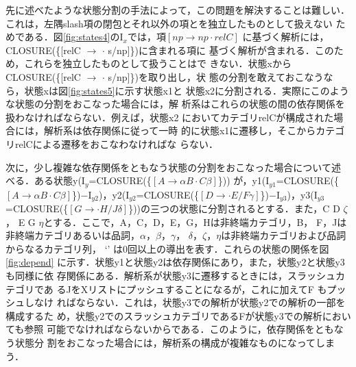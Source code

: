 先に述べたような状態分割の手法によって，この問題を解決することは難しい．
これは，左隅slash項の閉包とそれ以外の項とを独立したものとして扱えない
ためである．図\ref{fig:states4}のI$_{x}$では，項$[np \to np \cdot relC]$ 
に基づく解析には，CLOSURE(\{[relC $\to$ $\cdot$ s/np]\})に含まれる項に
基づく解析が含まれる．このため，これらを独立したものとして扱うことはで
きない．状態xからCLOSURE(\{[relC $\to$ $\cdot$ s/np]\})を取り出し，状
態の分割を敢えておこなうなら，状態xは図\ref{fig:states5}に示す状態x1と
状態x2に分割される．実際にこのような状態の分割をおこなった場合には，解
析系はこれらの状態の間の依存関係を扱わなければならない．例えば，状態x2
においてカテゴリrelCが構成された場合には，解析系は依存関係に従って一時
的に状態x1に遷移し，そこからカテゴリrelCによる遷移をおこなわなければな
らない．

次に，少し複雑な依存関係をともなう状態の分割をおこなった場合について述
べる．ある状態y(I$_{y}$=CLOSURE(\{$[A \to \alpha B \cdot C \beta]$\}))
が，y1(I$_{y1}$=CLOSURE(\{$[A \to \alpha B \cdot C
\beta]$\})$-$I$_{y2}$)，y2(I$_{y2}$=CLOSURE(\{$[D \to \cdot E/F
\gamma]$\})$-$I$_{y3}$)，y3(I$_{y3}$=CLOSURE(\{$[G \to \cdot H/J
\delta]$\}))の三つの状態に分割されるとする．また，C \deriv D $\zeta$，
E \deriv G $\eta$とする．ここで，A，C，D，E，G，Hは非終端カテゴリ，B，
F，Jは非終端カテゴリあるいは品詞，$\alpha$，$\beta$，$\gamma$，
$\delta$，$\zeta$，$\eta$は非終端カテゴリおよび品詞からなるカテゴリ列，
`\deriv' は0回以上の導出を表す．これらの状態の関係を図\ref{fig:depend}
に示す．状態y1と状態y2は依存関係にあり，また，状態y2と状態y3も同様に依
存関係にある．解析系が状態y3に遷移するときには，スラッシュカテゴリであ
るJをXリストにプッシュすることになるが，これに加えてF もプッシュしなけ
ればならない．これは，状態y3での解析が状態y2での解析の一部を構成するた
め，状態y2でのスラッシュカテゴリであるFが状態y3での解析においても参照
可能でなければならないからである．このように，依存関係をともなう状態分
割をおこなった場合には，解析系の構成が複雑なものになってしまう．

\setlength{\mpw}{3.5cm}

